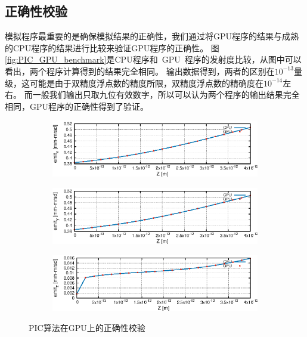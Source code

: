 \subsection{正确性校验}
模拟程序最重要的是确保模拟结果的正确性，我们通过将GPU程序的结果与成熟的CPU程序的结果进行比较来验证GPU程序的正确性。
图\eqref{fig:PIC_GPU_benchmark}是CPU程序和~GPU~程序的发射度比较，从图中可以看出，两个程序计算得到的结果完全相同。
输出数据得到，两者的区别在$10^{-13}$量级，这可能是由于双精度浮点数的精度所限，双精度浮点数的精确度在$10^{-14}$左右。
而一般我们输出只取九位有效数字，所以可以认为两个程序的输出结果完全相同，GPU程序的正确性得到了验证。
\begin{figure}[!htb]
    \centering
    \begin{subfigure}[b]{0.9\textwidth}
        \includegraphics[width=\textwidth]{Img/PIC_GPU_benchmark_x.eps}
    \end{subfigure}
    \begin{subfigure}[b]{0.9\textwidth}
        \includegraphics[width=\textwidth]{Img/PIC_GPU_benchmark_y.eps}
    \end{subfigure}
    \begin{subfigure}[b]{0.9\textwidth}
        \includegraphics[width=\textwidth]{Img/PIC_GPU_benchmark_z.eps}
    \end{subfigure}
    \caption{PIC算法在GPU上的正确性校验}\label{fig:PIC_GPU_benchmark}
\end{figure}

